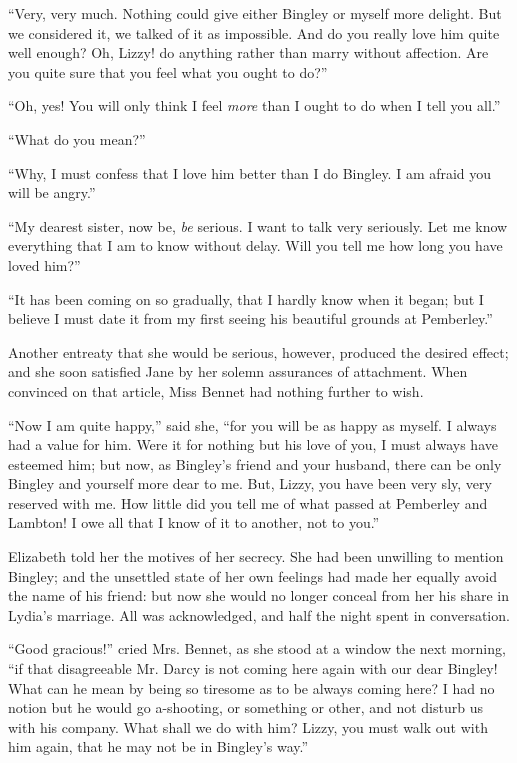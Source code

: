 ``Very, very much. Nothing could give either Bingley or myself more delight. But we considered it, we talked of it as impossible. And do you really love him quite well enough? Oh, Lizzy! do anything rather than marry without affection. Are you quite sure that you feel what you ought to do?''

``Oh, yes! You will only think I feel \textit{more} than I ought to do when I tell you all.''

``What do you mean?''

``Why, I must confess that I love him better than I do Bingley. I am afraid you will be angry.''

``My dearest sister, now be, \textit{be} serious. I want to talk very seriously. Let me know everything that I am to know without delay. Will you tell me how long you have loved him?''

``It has been coming on so gradually, that I hardly know when it began; but I believe I must date it from my first seeing his beautiful grounds at Pemberley.''

Another entreaty that she would be serious, however, produced the desired effect; and she soon satisfied Jane by her solemn assurances of attachment. When convinced on that article, Miss Bennet had nothing further to wish.

``Now I am quite happy,'' said she, ``for you will be as happy as myself. I always had a value for him. Were it for nothing but his love of you, I must always have esteemed him; but now, as Bingley's friend and your husband, there can be only Bingley and yourself more dear to me. But, Lizzy, you have been very sly, very reserved with me. How little did you tell me of what passed at Pemberley and Lambton! I owe all that I know of it to another, not to you.''

Elizabeth told her the motives of her secrecy. She had been unwilling to mention Bingley; and the unsettled state of her own feelings had made her equally avoid the name of his friend: but now she would no longer conceal from her his share in Lydia's marriage. All was acknowledged, and half the night spent in conversation.

``Good gracious!'' cried Mrs. Bennet, as she stood at a window the next morning, ``if that disagreeable Mr. Darcy is not coming here again with our dear Bingley! What can he mean by being so tiresome as to be always coming here? I had no notion but he would go a-shooting, or something or other, and not disturb us with his company. What shall we do with him? Lizzy, you must walk out with him again, that he may not be in Bingley's way.''

